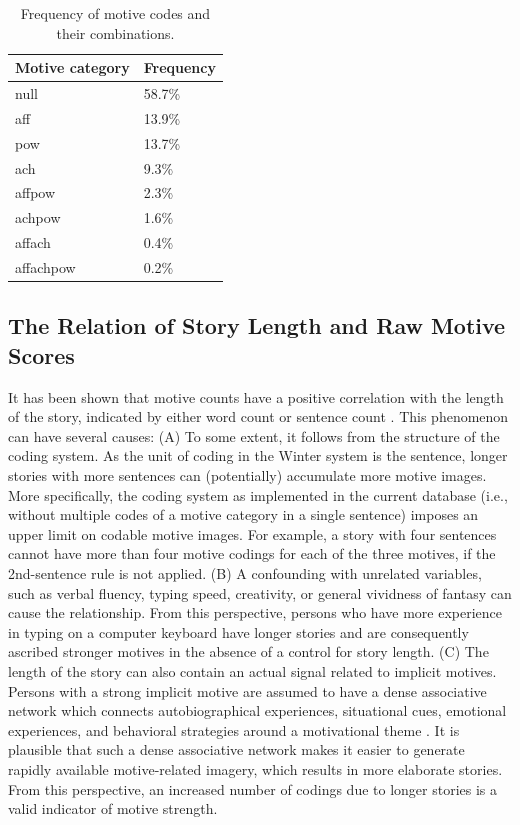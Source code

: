 \documentclass[man,a4paper,mask]{apa6}\usepackage[]{graphicx}\usepackage[]{color}
\begin{document}
\begin{table}[ht]
\centering
\caption{Frequency of motive codes and their combinations.} 
\label{tab:motcat}
\begin{tabular}{ll}
  \hline
Motive category & Frequency \\ 
  \hline
null & 58.7\% \\ 
  aff & 13.9\% \\ 
  pow & 13.7\% \\ 
  ach & 9.3\% \\ 
  affpow & 2.3\% \\ 
  achpow & 1.6\% \\ 
  affach & 0.4\% \\ 
  affachpow & 0.2\% \\ 
   \hline
\end{tabular}
\end{table}



\subsection{The Relation of Story Length and Raw Motive Scores}

It has been shown that motive counts have a positive correlation with the length of the story, indicated by either word count or sentence count \parencite{pang_ContentCodingMethods_2010,schultheiss_MeasuringImplicitMotives_2007}. This phenomenon can have several causes: (A) To some extent, it follows from the structure of the coding system. As the unit of coding in the Winter system is the sentence, longer stories with more sentences can (potentially) accumulate more motive images. More specifically, the coding system as implemented in the current database (i.e., without multiple codes of a motive category in a single sentence) imposes an upper limit on codable motive images. For example, a story with four sentences cannot have more than four motive codings for each of the three motives, if the 2nd-sentence rule is not applied.
(B) A confounding with unrelated variables, such as verbal fluency, typing speed, creativity, or general vividness of fantasy can cause the relationship. From this perspective, persons who have more experience in typing on a computer keyboard have longer stories and are consequently ascribed stronger motives in the absence of a control for story length.
(C) The length of the story can also contain an actual signal related to implicit motives. Persons with a strong implicit motive are assumed to have a dense associative network which connects autobiographical experiences, situational cues, emotional experiences, and behavioral strategies around a motivational theme \parencite{schultheiss_reliability_2008,mcclelland_human_1987}. It is plausible that such a dense associative network makes it easier to generate rapidly available motive-related imagery, which results in more elaborate stories. From this perspective, an increased number of codings due to longer stories is a valid indicator of motive strength.
\end{document}
